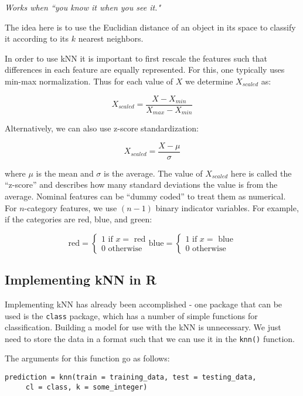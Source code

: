 \documentclass[]{article}
\begin{document}
\emph{Works when ``you know it when you see it."}

\vspace{0.2cm}


The idea here is to use the Euclidian distance of an object in its space to classify it according to its $k$ nearest neighbors.

In order to use kNN it is important to first rescale the features such that differences in each feature are equally represented.  For this, one typically uses min-max normalization.  Thus for each value of $X$ we determine $X_{scaled}$ as:

$$
X_{scaled} = \frac{X-X_{min}}{X_{max}-X_{min}}
$$

Alternatively, we can also use z-score standardization:

$$
X_{scaled} = \frac{X-\mu}{\sigma}
$$

where $\mu$ is the mean and $\sigma$ is the average.  The value of $X_{scaled}$ here is called the ``z-score'' and describes how many standard deviations the value is from the average.
Nominal features can be ``dummy coded'' to treat them as numerical.  For $n$-category features, we use $(n-1)$ binary indicator variables.  For example, if the categories are red, blue, and green:

\begin{equation}
\text{red} =
\begin{cases}
	\text{1 if $x =$ red}\\
	\text{0 otherwise}
\end{cases}       
\text{blue} = 
\begin{cases}
	\text{1 if $x =$ blue}\\
	\text{0 otherwise}
\end{cases}
\end{equation}

\subsection{Implementing kNN in R}
Implementing kNN has already been accomplished - one package that can be used is the \verb|class| package, which has a number of simple functions for classification.  Building a model for use with the kNN is unnecessary.  We just need to store the data in a format such that we can use it in the \verb|knn()| function.

The arguments for this function go as follows:

\begin{verbatim}
prediction = knn(train = training_data, test = testing_data, 
     cl = class, k = some_integer)
\end{verbatim}
\end{document}
